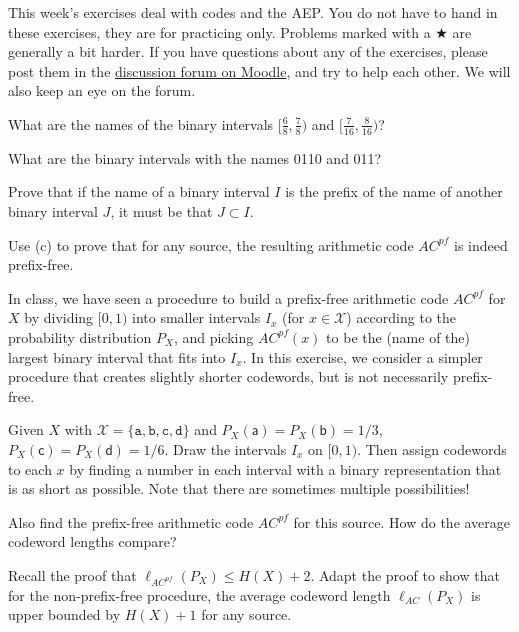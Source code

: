 \documentclass[a4paper,10pt,landscape,twocolumn]{scrartcl}
\begin{document}
\practiceproblems

{\sffamily\noindent
This week's exercises deal with codes and the AEP. You do not have to hand in these exercises, they are for practicing only. Problems marked with a $\bigstar$ are generally a bit harder. If you have questions about any of the exercises, please post them in the \href{https://www.moodle.ch/lms/mod/forum/view.php?id=2219}{discussion forum on Moodle}, and try to help each other. We will also keep an eye on the forum.
}

\begin{exercise}
	\begin{subex}
	What are the names of the binary intervals $[\frac{6}{8},\frac{7}{8})$ and $[\frac{7}{16},\frac{8}{16})$?
	\end{subex}
	\begin{subex}
	What are the binary intervals with the names 0110 and 011?
	\end{subex}
	\begin{subex}
	Prove that if the name of a binary interval $I$ is the prefix of the name of another binary interval $J$, it must be that $J \subset I$.
	\end{subex}
	\begin{subex}
	Use (c) to prove that for any source, the resulting arithmetic code $AC^{pf}$ is indeed prefix-free.
	\end{subex}
\end{exercise}

\begin{exercise}
In class, we have seen a procedure to build a prefix-free arithmetic code $AC^{pf}$ for $X$ by dividing $[0,1)$ into smaller intervals $I_x$ (for $x \in \mathcal{X}$) according to the probability distribution $P_X$, and picking $AC^{pf}(x)$ to be the (name of the) largest binary interval that fits into $I_x$. In this exercise, we consider a simpler procedure that creates slightly shorter codewords, but is not necessarily prefix-free.
	\begin{subex}
	Given $X$ with $\mathcal{X} = \{\mathtt{a,b,c,d}\}$ and $P_X(\mathsf{a}) = P_X(\mathsf{b}) = 1/3$, $P_X(\mathsf{c}) = P_X(\mathsf{d}) = 1/6$. Draw the intervals $I_x$ on $[0,1)$. Then assign codewords to each $x$ by finding a number in each interval with a binary representation that is as short as possible. Note that there are sometimes multiple possibilities!
	\end{subex}
	\begin{subex}
	Also find the prefix-free arithmetic code $AC^{pf}$ for this source. How do the average codeword lengths compare?
	\end{subex}
	\begin{subex}
	Recall the proof that $\ell_{AC^{pf}}(P_X) \leq H(X) + 2$. Adapt the proof to show that for the non-prefix-free procedure, the average codeword length $\ell_{AC}(P_X)$ is upper bounded by $H(X) + 1$ for any source.
	\end{subex}
\end{exercise}
\end{document}
